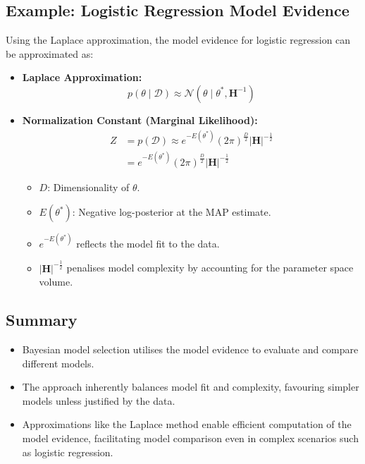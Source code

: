 \subsection{Example: Logistic Regression Model Evidence}

Using the Laplace approximation, the model evidence for logistic regression can be approximated as:

\begin{itemize}
    \item \textbf{Laplace Approximation:}
    \[
    p(\theta \mid \mathcal{D}) \approx \mathcal{N}(\theta \mid \theta^*, \mathbf{H}^{-1})
    \]
    \item \textbf{Normalization Constant (Marginal Likelihood):}
    \begin{align*}
        Z &= p(\mathcal{D}) \approx e^{-E(\theta^*)} (2\pi)^{\frac{D}{2}} |\mathbf{H}|^{-\frac{1}{2}} \\
        &= e^{-E(\theta^*)} (2\pi)^{\frac{D}{2}} \left|\mathbf{H}\right|^{-\frac{1}{2}}
    \end{align*}
    \begin{itemize}
        \item $D$: Dimensionality of $\theta$.
        \item $E(\theta^*)$: Negative log-posterior at the MAP estimate.
    \end{itemize}

    \begin{itemize}
        \item $e^{-E(\theta^*)}$ reflects the model fit to the data.
        \item $|\mathbf{H}|^{-\frac{1}{2}}$ penalises model complexity by accounting for the parameter space volume.
    \end{itemize}
\end{itemize}

\subsection{Summary}

\begin{itemize}
    \item Bayesian model selection utilises the model evidence to evaluate and compare different models.
    \item The approach inherently balances model fit and complexity, favouring simpler models unless justified by the data.
    \item Approximations like the Laplace method enable efficient computation of the model evidence, facilitating model comparison even in complex scenarios such as logistic regression.
\end{itemize}
